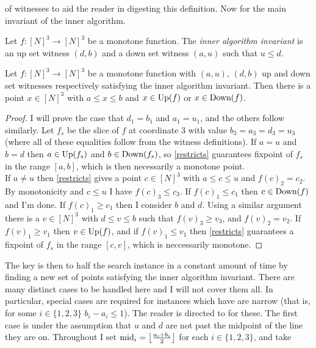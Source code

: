 of witnesses to aid the reader in digesting this definition.
Now for the main invariant of the inner algorithm.
\begin{definition}
  Let $f : [N]^3 \to [N]^3$ be a monotone function. The \emph{inner algorithm invariant}
  is an up set witness $(d, b)$ and a down set witness $(a, u)$ such that $u \leq d$.
\end{definition}
\begin{lemma}
  Let $f : [N]^3 \to [N]^3$ be a monotone function with $(a, u)$, $(d, b)$ up
  and down set witnesses respectively satisfying the inner algorithm invariant.
  Then there is a point $x \in [N]^3$ with $a \leq x \leq b$ and $x \in \text{Up}(f)$ or $x \in \text{Down}(f)$.
\end{lemma}
\begin{proof}
  I will prove the case that $d_1 = b_1$ and $a_1 = u_1$, and the others follow similarly.
  Let $f_s$ be the slice of $f$ at coordinate $3$ with value $b_3 = a_3 = d_3 = u_3$ (where all of
  these equalities follow from the witness definitions). If $a = u$ and $b = d$ then $a \in \text{Up}(f_s)$ and
  $b \in \text{Down}(f_s)$, so \cref{restricts} guarantees fixpoint of $f_s$ in the range $[a, b]$, which is then
  necessarily a monotone point. \\
  If $a \neq u$ then \cref{restricts} gives a point $c \in [N]^3$ with $a \leq c \leq u$ and $f(c)_2 = c_2$.
  By monotonicity and $c \leq u$ I have $f(c)_3 \leq c_3$. If $f(c)_1 \leq c_1$ then $c \in \text{Down}(f)$ and I'm done.
  If $f(c)_1 \geq c_1$ then I consider $b$ and $d$. Using a similar argument there is a $v \in [N]^3$ with $d \leq v \leq b$
  such that $f(v)_3 \geq v_3$, and $f(v)_2 = v_2$. If $f(v)_1 \geq v_1$ then $v \in \text{Up}(f)$, and if $f(v)_1 \leq v_1$
  then \cref{restricts} guarantees a fixpoint of $f_s$ in the range $[c, v]$, which is neccessarily monotone.
\end{proof}
The key is then to half the search instance in a constant amount of time by finding
a new set of points satisfying the inner algorithm invariant. There are many distinct cases
to be handled here and I will not cover them all. In particular, special cases are required for
instances which have are narrow (that is, for some $i \in \{1, 2, 3\}$ $b_i - a_i \leq 1$). The 
reader is directed to \citep{fasterTarski} for these. The first case is under the assumption that $u$ and $d$ are
not past the midpoint of the line they are on.
Throughout I set $\text{mid}_i = \left \lfloor \frac{a_i + b_i}{2} \right\rfloor$ for each $i \in \{1, 2, 3\}$, and take
